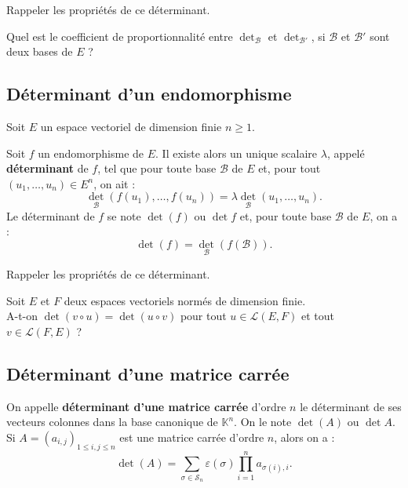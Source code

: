 \documentclass[french]{article}
\newcommand{\K}{\mathbb{K}}
\theoremstyle{plain}
\theoremstyle{definition}
\theoremstyle{remark}
\begin{document}
\begin{exo}
	Rappeler les propriétés de ce déterminant.
\end{exo}

\begin{exo}
	Quel est le coefficient de proportionnalité entre $\det_\mathcal{B}$ et $\det_{\mathcal{B}'}$, si $\mathcal{B}$ et $\mathcal{B}'$ sont deux bases de $E$ ?
\end{exo}

\subsection{Déterminant d'un endomorphisme}

Soit $E$ un espace vectoriel de dimension finie $n\geqslant 1$.

\begin{dfn}
	Soit $f$ un endomorphisme de $E$. Il existe alors un unique scalaire $\lambda$, appelé \textbf{déterminant} de $f$, tel que pour toute base $\mathcal{B}$ de $E$ et, pour tout $(u_1,\ldots,u_n)\in E^n$, on ait :
	$$\det_\mathcal{B}(f(u_1),\ldots,f(u_n))=\lambda\det_\mathcal{B}(u_1,\ldots,u_n).$$
	Le déterminant de $f$ se note $\det(f)$ ou $\det f$ et, pour toute base $\mathcal{B}$ de $E$, on a :
	$$\det(f)=\det_\mathcal{B}(f(\mathcal{B})).$$
\end{dfn}

\begin{exo}
	Rappeler les propriétés de ce déterminant.
\end{exo}

\begin{exo}
	Soit $E$ et $F$ deux espaces vectoriels normés de dimension finie. \\
	A-t-on $\det(v\circ u)=\det(u\circ v)$ pour tout $u\in\mathcal{L}(E,F)$ et tout $v\in\mathcal{L}(F,E)$ ?
\end{exo}

\subsection{Déterminant d'une matrice carrée}

\begin{dfn}
	On appelle \textbf{déterminant d'une matrice carrée} d'ordre $n$ le déterminant de ses vecteurs colonnes dans la base canonique de $\K^n$. On le note $\det(A)$ ou $\det A$. \\
	Si $A=(a_{i,j})_{1\leqslant i,j\leqslant n}$ est une matrice carrée d'ordre $n$, alors on a :
	$$\det(A)=\sum_{\sigma\in\mathcal{S}_n}\varepsilon(\sigma)\prod_{i=1}^{n}a_{\sigma(i),i}.$$
\end{dfn}
\end{document}
